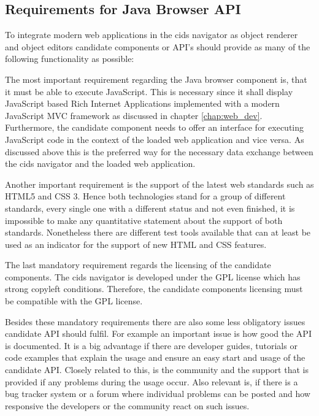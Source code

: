 \subsection{Requirements for Java Browser API}

To integrate modern web applications in the cids navigator as object renderer and object editors candidate components or API's should provide as many of the following functionality as possible:

The most important requirement regarding the Java browser component is, that it must be able to execute JavaScript.
This is necessary since it shall display JavaScript based Rich Internet Applications implemented with a modern JavaScript MVC framework as discussed in chapter \ref{chap:web_dev}.
Furthermore, the candidate component needs to offer an interface for executing JavaScript code in the context of the loaded web application and vice versa.
As discussed above this is the preferred way for the necessary data exchange between the cids navigator and the  loaded web application.

Another important requirement is the support of the latest web standards such as HTML5 and CSS 3. 
Hence both technologies stand for a group of different standards, every single one with a different status and not even finished, it is impossible to make any quantitative statement about the support of both standards.
Nonetheless there are different test tools available that can at least be used as an indicator for the support of new HTML and CSS features.

The last mandatory requirement regards the licensing of the candidate components.
The cids navigator is developed under the GPL license which has strong copyleft conditions.
Therefore, the candidate components licensing must be compatible with the GPL license.

Besides these mandatory requirements there are also some less obligatory issues candidate API should fulfil.
For example an important issue is how good the API is documented.
It is a big advantage if there are developer guides, tutorials or code examples that explain the usage and ensure an easy start and usage of the candidate API.
Closely related to this, is the community and the support that is provided if any problems during the usage occur.
Also relevant is, if there is a bug tracker system or a forum where individual problems can be posted and how responsive the developers or the community react on such issues.

